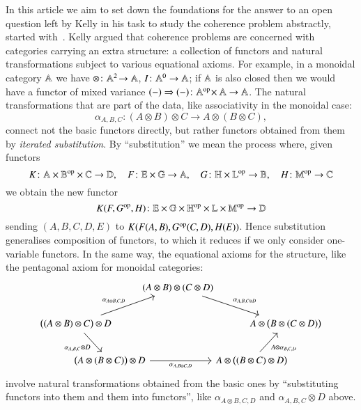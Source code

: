 In this article we aim to set down the foundations for the answer to an open question left by Kelly in his task to study the coherence problem abstractly, started with~\cite{kelly_abstract_1972,kelly_many-variable_1972}. 
Kelly argued that coherence problems are concerned with categories carrying an extra structure: a collection of functors and natural transformations subject to various equational axioms. For example, in a monoidal category $\mathbb A$ we have $\otimes \colon \mathbb A^2\! \to \mathbb A$, $I \colon \mathbb A^0 \to \mathbb A$; if $\mathbb A$ is also closed then we would have a functor of mixed variance $(-) \Rightarrow (-) \colon \mathbb A^{\text{op}}\! \times \mathbb A \to \mathbb A$. The natural transformations that are part of the data, like associativity in the monoidal case:
\[
\alpha_{A,B,C} \colon (A \otimes B) \otimes C \to A \otimes (B \otimes C),
\]
connect not the basic functors directly, but rather functors obtained from them by \emph{iterated substitution}. By ``substitution'' we mean the process where, given functors
\[
K \colon \mathbb A \times \mathbb B^{\text{op}} \times \mathbb C \to \mathbb D, \quad F \colon \mathbb E \times \mathbb G \to \mathbb A, \quad G \colon \mathbb H \times \mathbb L^{\text{op}} \to \mathbb B, \quad H \colon \mathbb M^{\text{op}} \to \mathbb C
\]
we obtain the new functor
\[
K(F,G^{\text{op}}, H) \colon \mathbb E \times \mathbb G \times \mathbb H^{\text{op}} \times \mathbb L \times \mathbb M^{\text{op}} \to \mathbb D\label{substitution functors example}
\]
sending $(A,B,C,D,E)$ to $K(F(A,B),G^{\text{op}} (C,D), H(E))$. Hence substitution generalises composition of functors, to which it reduces if we only consider one-variable functors. In the same way, the equational axioms for the structure, like the pentagonal axiom for monoidal categories:
\[
\begin{tikzcd}[column sep={3.5em,between origins},row sep=2em]
& & & (A \otimes B) \otimes (C \otimes D) \ar[drr,"\alpha_{A,B,C\otimes D}"] \\
\bigl( (A \otimes B) \otimes C \bigr) \otimes D \ar[urrr,"\alpha_{A\otimes B, C, D}"] \ar[dr,"\alpha_{A,B,C} \otimes D"'] & & & & & A \otimes \bigl( B \otimes (C \otimes D) \bigr) \\
& \bigl( A \otimes (B \otimes C) \bigr) \otimes D \ar[rrr,"\alpha_{A,B \otimes C, D}"'] & & & A \otimes \bigl( (B \otimes C) \otimes D \bigr) \ar[ur,"A \otimes \alpha_{B,C,D}"']
\end{tikzcd}
\]
involve natural transformations obtained from the basic ones by ``substituting functors into them and them into functors'', like $\alpha_{A \otimes B, C, D}$ and $\alpha_{A,B,C} \otimes D$ above. 


